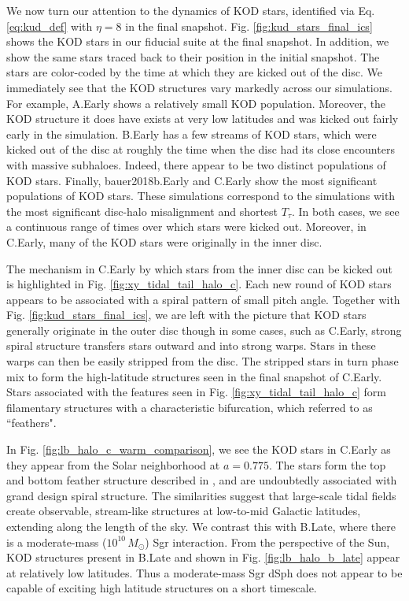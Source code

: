 We now turn our attention to the dynamics of KOD stars, identified via
Eq. \ref{eq:kud_def} with $\eta=8$ in the final
snapshot. Fig. \ref{fig:kud_stars_final_ics} shows the KOD stars in
our fiducial suite at the final snapshot. In addition, we show the
same stars traced back to their position in the initial snapshot. The
stars are color-coded by the time at which they are kicked out of the
disc.  We immediately see that the KOD structures vary markedly across
our simulations. For example, A.Early shows a relatively small KOD
population.  Moreover, the KOD structure it does have exists at very
low latitudes and was kicked out fairly early in the
simulation. B.Early has a few streams of KOD stars, which were kicked
out of the disc at roughly the time when the disc had its close
encounters with massive subhaloes. Indeed, there appear to be two
distinct populations of KOD stars. Finally, bauer2018b.Early and
C.Early show the most significant populations of KOD stars.  These
simulations correspond to the simulations with the most significant
disc-halo misalignment and shortest $T_\tau$. In both cases, we see a
continuous range of times over which stars were kicked out. Moreover,
in C.Early, many of the KOD stars were originally in the inner disc.

The mechanism in C.Early by which stars from the inner disc can be
kicked out is highlighted in Fig. \ref{fig:xy_tidal_tail_halo_c}. Each
new round of KOD stars appears to be associated with a spiral pattern
of small pitch angle. Together with
Fig. \ref{fig:kud_stars_final_ics}, we are left with the picture that
KOD stars generally originate in the outer disc though in some cases,
such as C.Early, strong spiral structure transfers stars outward and
into strong warps. Stars in these warps can then be easily stripped
from the disc. The stripped stars in turn phase mix to form the
high-latitude structures seen in the final snapshot of C.Early.  Stars
associated with the features seen in
Fig. \ref{fig:xy_tidal_tail_halo_c} form filamentary structures with a
characteristic bifurcation, which \citet{laporte_2019_feathers}
referred to as ``feathers".

In Fig. \ref{fig:lb_halo_c_warm_comparison}, we see the KOD stars in
C.Early as they appear from the Solar neighborhood at $a=0.775$. The
stars form the top and bottom feather structure described in
\citet{laporte_2019_feathers}, and are undoubtedly associated with
grand design spiral structure. The similarities suggest that
large-scale tidal fields create observable, stream-like structures at
low-to-mid Galactic latitudes, extending along the length of the sky.
We contrast this with B.Late, where there is a moderate-mass
($10^{10}\,M_\odot$) Sgr interaction. From the perspective of the Sun,
KOD structures present in B.Late and shown in
Fig. \ref{fig:lb_halo_b_late} appear at relatively low latitudes. Thus
a moderate-mass Sgr dSph does not appear to be capable of exciting
high latitude structures on a short timescale.

